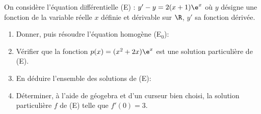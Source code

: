 \begin{exercice_cours}[\quad]{}

	On considère l’équation différentielle (E) : $y' - y = 2(x + 1)\e^x$ où $y$ désigne une fonction de la variable réelle $x$ définie et dérivable sur $\R$, $y'$ sa fonction dérivée.

\begin{enumerate}
	\item Donner, puis résoudre l'équation homogène (E$_0$):  \hfill\reponseLigne[7cm]{}
	\item Vérifier que la fonction $p(x)=(x^2+2x)\e^{x}$ est une solution particulière de (E). 
	\begin{blocvisiblex}[height=2]
{\quad}
\end{blocvisiblex}
\item En déduire l'ensemble des solutions de (E):    \hfill\reponseLigne[7cm]{}
	\item Déterminer, à l'aide de géogebra et d'un curseur bien choisi, la solution particulière $f$ de (E) telle que $f'(0)=3$.   \hfill\reponseLigne[7cm]{}
\end{enumerate}
\end{exercice_cours}
